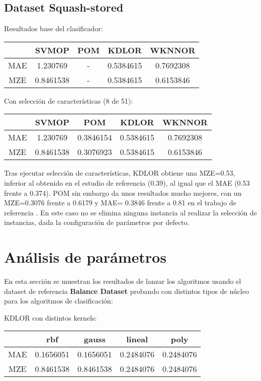 \subsection{Dataset Squash-stored}
Resultados base del clasificador:
\begin{center}
\begin{tabular}{ c c c c c }
	& SVMOP & POM & KDLOR & WKNNOR \\
	\hline	
	MAE &   1.230769  & - & 0.5384615  &  0.7692308 \\
	MZE &	0.8461538 & - & 0.5384615 & 0.6153846 \\
	\hline  
\end{tabular}
\end{center}
\vspace{20pt}
Con selección de características (8 de 51):
\begin{center}
\begin{tabular}{ c c c c c }
	& SVMOP & POM & KDLOR & WKNNOR  \\
	\hline	
	MAE &   1.230769  & 0.3846154 & 0.5384615  &  0.7692308 \\
	MZE &	0.8461538 & 0.3076923 & 0.5384615 & 0.6153846 \\
	\hline  
\end{tabular}
\end{center}
Tras ejecutar selección de características, KDLOR obtiene una MZE=0.53, inferior al obtenido en el estudio de referencia (0.39), al igual que el MAE (0.53 frente a 0.374). POM sin embargo da unos resultados mucho mejores, con un MZE=0.3076 frente a 0.6179 y MAE= 0.3846 frente a 0.81 en el trabajo de referencia \cite{Gutiérrez2016}.
En este caso no se elimina ninguna instancia al realizar la selección de instancias, dada la configuración de parámetros por defecto.


\section*{Análisis de parámetros}
En esta sección se muestran los resultados de lanzar los algoritmos usando el dataset de referencia \textbf{Balance Dataset} probando con distintos tipos de núcleo para los algoritmos de clasificación:

KDLOR con distintos kernels:

\begin{center}
\begin{tabular}{ c c c c c  }
	& rbf & gauss & lineal & poly \\
	\hline	
	MAE &   0.1656051  & 0.1656051 & 0.2484076  &  0.2484076 \\
	MZE &	0.8461538 & 0.8461538 & 0.2484076 & 0.2484076 \\
	\hline  
\end{tabular}
\end{center}
\vspace{20pt}

